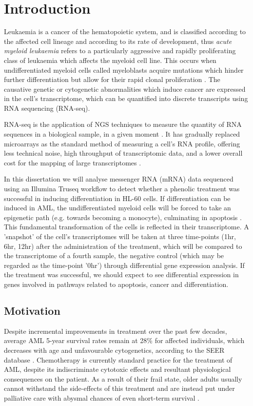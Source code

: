 \chapter{Introduction}
\label{intro}
Leukaemia is a cancer of the hematopoietic system, and is classified according to the affected cell lineage and according to its rate of development, thus \textit{acute myeloid leukaemia} refers to a particularly aggressive and rapidly proliferating class of leukaemia which affects the myeloid cell line. This occurs when undifferentiated myeloid cells called myeloblasts acquire mutations which hinder further differentiation but allow for their rapid clonal proliferation \citep{Khwaja2016}. The causative genetic or cytogenetic abnormalities which induce cancer are expressed in the cell's transcriptome, which can be quantified into discrete transcripts using RNA sequencing (RNA-seq). 

RNA-seq is the application of \ac{NGS} techniques to measure the quantity of RNA sequences in a biological sample, in a given moment \citep{zhong2009}. It has gradually replaced microarrays as the standard method of measuring a cell's RNA profile, offering less technical noise, high throughput of transcriptomic data, and a lower overall cost for the mapping of large transcriptomes \citep{zhao2014comparison, rao2019comparison}. 

In this dissertation we will analyse messenger RNA (mRNA) data sequenced using an Illumina Truseq workflow to detect whether a phenolic treatment was successful in inducing differentiation in HL-60 cells. If differentiation can be induced in \ac{AML}, the undifferentiated myeloid cells will be forced to take an epigenetic path (e.g. towards becoming a monocyte), culminating in apoptosis \citep{santos2000expression, mark2017transcriptomes}. This fundamental transformation of the cells is reflected in their transcriptome. A 'snapshot' of the cell's transcriptomes will be taken at three time-points (1hr, 6hr, 12hr) after the administration of the treatment, which will be compared to the transcriptome of a fourth sample, the negative control (which may be regarded as the time-point '0hr') through differential gene expression analysis. If the treatment was successful, we should expect to see differential expression in genes involved in pathways related to apoptosis, cancer and differentiation.



\section{Motivation} 
Despite incremental improvements in treatment over the past few decades, average \ac{AML} 5-year survival rates remain at 28\% for affected individuals, which decreases with age and unfavourable cytogenetics, according to the SEER database \citep{sasaki2021novo}. Chemotherapy is currently standard practice for the treatment of \ac{AML}, despite its indiscriminate cytotoxic effects and resultant physiological consequences on the patient. As a result of their frail state, older adults usually cannot withstand the side-effects of this treatment and are instead put under palliative care with abysmal chances of even short-term survival \citep{lancet2018overall}. 

